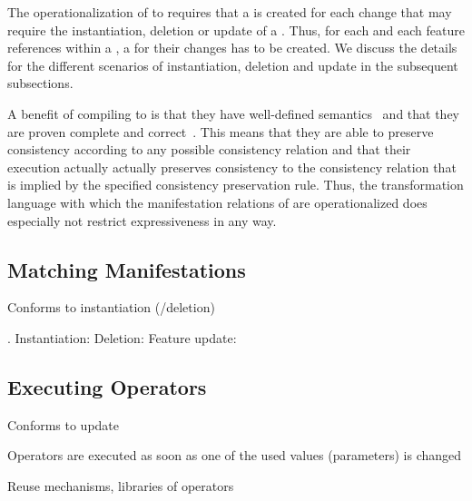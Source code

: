 The operationalization of \commonalities to \reactions requires that a \reaction is created for each change that may require the instantiation, deletion or update of a \commonality.
Thus, for each \metaclass and each feature references within a \commonality, a \reaction for their changes has to be created.
We discuss the details for the different scenarios of instantiation, deletion and update in the subsequent subsections.

A benefit of compiling to \reactions is that they have well-defined semantics~\cite[Sec. 6.7]{kramer2017a} and that they are proven complete and correct~\cite[Sec. 9.2.4 and 9.3]{kramer2017a}.
This means that they are able to preserve consistency according to any possible consistency relation and that their execution actually actually preserves consistency to the consistency relation that is implied by the specified consistency preservation rule.
Thus, the transformation language with which the manifestation relations of \commonalities are operationalized does especially not restrict expressiveness in any way.


\subsection{Matching Manifestations}

Conforms to instantiation (/deletion)

\cite[Sec. 7.7.4]{kramer2017a}.
Instantiation: \cite[Alg. 1]{kramer2017a}
Deletion: \cite[Alg. 2]{kramer2017a}
Feature update: \cite[Alg. 3]{kramer2017a}


\subsection{Executing Operators}

Conforms to update

Operators are executed as soon as one of the used values (parameters) is changed

Reuse mechanisms, libraries of operators

